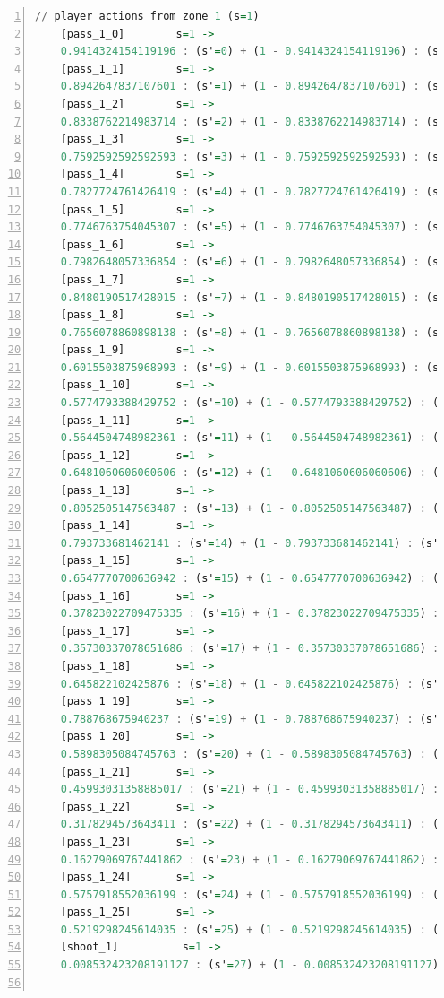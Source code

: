 \documentclass{l4proj}
\begin{document}
\begin{appendices}
\begin{lstlisting}[language=Haskell, numbers=left, caption=MDP used for strategy generation. This is the model specification as-is after the refinements at the end of chapter 3.]
	// player actions from zone 1 (s=1)
	[pass_1_0]	      s=1 ->
	0.9414324154119196 : (s'=0) + (1 - 0.9414324154119196) : (s'=26);
	[pass_1_1]	      s=1 ->
	0.8942647837107601 : (s'=1) + (1 - 0.8942647837107601) : (s'=26);
	[pass_1_2]	      s=1 ->
	0.8338762214983714 : (s'=2) + (1 - 0.8338762214983714) : (s'=26);
	[pass_1_3]	      s=1 ->
	0.7592592592592593 : (s'=3) + (1 - 0.7592592592592593) : (s'=26);
	[pass_1_4]	      s=1 ->
	0.7827724761426419 : (s'=4) + (1 - 0.7827724761426419) : (s'=26);
	[pass_1_5]	      s=1 ->
	0.7746763754045307 : (s'=5) + (1 - 0.7746763754045307) : (s'=26);
	[pass_1_6]	      s=1 ->
	0.7982648057336854 : (s'=6) + (1 - 0.7982648057336854) : (s'=26);
	[pass_1_7]	      s=1 ->
	0.8480190517428015 : (s'=7) + (1 - 0.8480190517428015) : (s'=26);
	[pass_1_8]	      s=1 ->
	0.7656078860898138 : (s'=8) + (1 - 0.7656078860898138) : (s'=26);
	[pass_1_9]	      s=1 ->
	0.6015503875968993 : (s'=9) + (1 - 0.6015503875968993) : (s'=26);
	[pass_1_10]	      s=1 ->
	0.5774793388429752 : (s'=10) + (1 - 0.5774793388429752) : (s'=26);
	[pass_1_11]	      s=1 ->
	0.5644504748982361 : (s'=11) + (1 - 0.5644504748982361) : (s'=26);
	[pass_1_12]	      s=1 ->
	0.6481060606060606 : (s'=12) + (1 - 0.6481060606060606) : (s'=26);
	[pass_1_13]	      s=1 ->
	0.8052505147563487 : (s'=13) + (1 - 0.8052505147563487) : (s'=26);
	[pass_1_14]	      s=1 ->
	0.793733681462141 : (s'=14) + (1 - 0.793733681462141) : (s'=26);
	[pass_1_15]	      s=1 ->
	0.6547770700636942 : (s'=15) + (1 - 0.6547770700636942) : (s'=26);
	[pass_1_16]	      s=1 ->
	0.37823022709475335 : (s'=16) + (1 - 0.37823022709475335) : (s'=26);
	[pass_1_17]	      s=1 ->
	0.35730337078651686 : (s'=17) + (1 - 0.35730337078651686) : (s'=26);
	[pass_1_18]	      s=1 ->
	0.645822102425876 : (s'=18) + (1 - 0.645822102425876) : (s'=26);
	[pass_1_19]	      s=1 ->
	0.788768675940237 : (s'=19) + (1 - 0.788768675940237) : (s'=26);
	[pass_1_20]	      s=1 ->
	0.5898305084745763 : (s'=20) + (1 - 0.5898305084745763) : (s'=26);
	[pass_1_21]	      s=1 ->
	0.45993031358885017 : (s'=21) + (1 - 0.45993031358885017) : (s'=26);
	[pass_1_22]	      s=1 ->
	0.3178294573643411 : (s'=22) + (1 - 0.3178294573643411) : (s'=26);
	[pass_1_23]	      s=1 ->
	0.16279069767441862 : (s'=23) + (1 - 0.16279069767441862) : (s'=26);
	[pass_1_24]	      s=1 ->
	0.5757918552036199 : (s'=24) + (1 - 0.5757918552036199) : (s'=26);
	[pass_1_25]	      s=1 ->
	0.5219298245614035 : (s'=25) + (1 - 0.5219298245614035) : (s'=26);
	[shoot_1]	       s=1 ->
	0.008532423208191127 : (s'=27) + (1 - 0.008532423208191127) : (s'=26);


\end{lstlisting}
\end{appendices}
\end{document}
